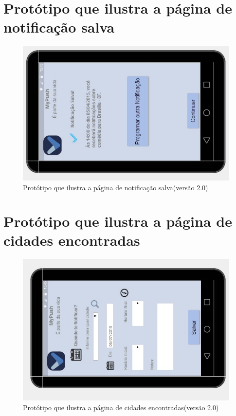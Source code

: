 \begin{apendicesenv}
    \pagebreak
      \section*{Protótipo que ilustra a página de notificação salva}

    \begin{figure}[!htbp]
      \centering
      \includegraphics[scale=0.9, angle=-90]{editaveis/figuras/prototipo_alta_fidelidade_v2/2_5}
      \caption{Protótipo que ilustra a página de notificação salva(versão 2.0)}
      \label{v2}
    \end{figure}
    
    \pagebreak
      \section*{Protótipo que ilustra a página de cidades encontradas}

    \begin{figure}[!htbp]
      \centering
      \includegraphics[scale=0.9, angle=-90]{editaveis/figuras/prototipo_alta_fidelidade_v2/2_6}
      \caption{Protótipo que ilustra a página de cidades encontradas(versão 2.0)}
      \label{v2}
    \end{figure}
    

\end{apendicesenv}
